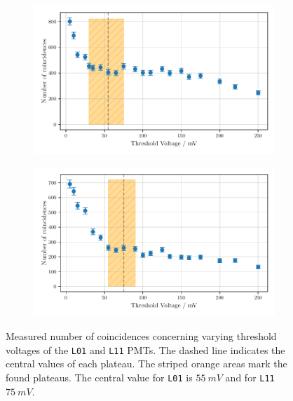 \begin{figure}
    \centering
    \begin{subfigure}[b]{0.48\textwidth}
        \includegraphics[width=\textwidth]{plots/threshL01.pdf}
    \end{subfigure}\hfill
    \begin{subfigure}[b]{0.48\textwidth}
        \includegraphics[width=\textwidth]{plots/threshL11.pdf}
    \end{subfigure}
    \caption{Measured number of coincidences concerning varying threshold voltages
    of the \texttt{L01} and \texttt{L11} PMTs.
    The dashed line indicates the central values of each plateau. The striped orange areas mark the found plateaus.
    The central value for \texttt{L01} is $\SI{55}{mV}$ and for \texttt{L11} $\SI{75}{mV}$.}
    \label{fig:appthresh4}
\end{figure}
